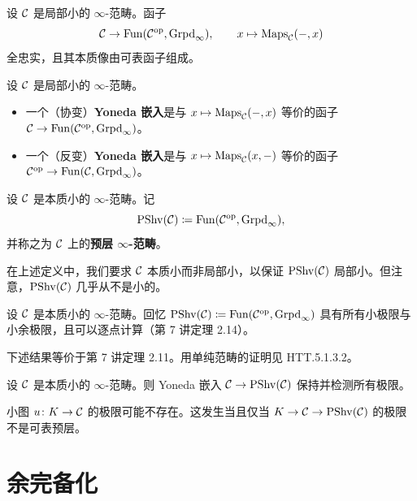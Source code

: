 \begin{corollary}\label{L11-4.8}
设 $\mathcal{C}$ 是局部小的 $\infty$-范畴。函子
\[
\mathcal{C}\to\operatorname{Fun}(\mathcal{C}^{\mathrm{op}},\operatorname{Grpd}_\infty),\qquad x\mapsto\mathrm{Maps}_{\mathcal{C}}(-,x)
\]
全忠实，且其本质像由可表函子组成。
\end{corollary}

\begin{definition}\label{L11-4.9}
设 $\mathcal{C}$ 是局部小的 $\infty$-范畴。
\begin{itemize}[leftmargin=2.2em,itemsep=0.1em]
\item 一个（协变）\textbf{Yoneda 嵌入}是与 $x\mapsto\mathrm{Maps}_{\mathcal{C}}(-,x)$ 等价的函子 $\mathcal{C}\to\operatorname{Fun}(\mathcal{C}^{\mathrm{op}},\operatorname{Grpd}_\infty)$。
\item 一个（反变）\textbf{Yoneda 嵌入}是与 $x\mapsto\mathrm{Maps}_{\mathcal{C}}(x,-)$ 等价的函子 $\mathcal{C}^{\mathrm{op}}\to\operatorname{Fun}(\mathcal{C},\operatorname{Grpd}_\infty)$。
\end{itemize}
\end{definition}

\begin{definition}\label{L11-4.10}
设 $\mathcal{C}$ 是本质小的 $\infty$-范畴。记
\[
\mathrm{PShv}(\mathcal{C})\coloneqq\operatorname{Fun}(\mathcal{C}^{\mathrm{op}},\operatorname{Grpd}_\infty),
\]
并称之为 $\mathcal{C}$ 上的\textbf{预层 $\infty$-范畴}。
\end{definition}

\begin{remark}\label{L11-4.11}
在上述定义中，我们要求 $\mathcal{C}$ 本质小而非局部小，以保证 $\mathrm{PShv}(\mathcal{C})$ 局部小。但注意，$\mathrm{PShv}(\mathcal{C})$ 几乎从不是小的。
\end{remark}

\nitem\label{L11-4.12} 设 $\mathcal{C}$ 是本质小的 $\infty$-范畴。回忆 $\mathrm{PShv}(\mathcal{C})\coloneqq\operatorname{Fun}(\mathcal{C}^{\mathrm{op}},\operatorname{Grpd}_\infty)$ 具有所有小极限与小余极限，且可以逐点计算（第 7 讲定理 2.14）。

下述结果等价于第 7 讲定理 2.11。用单纯范畴的证明见 HTT.5.1.3.2。

\begin{theorem}\label{L11-4.13}
设 $\mathcal{C}$ 是本质小的 $\infty$-范畴。则 Yoneda 嵌入 $\mathcal{C}\to\mathrm{PShv}(\mathcal{C})$ 保持并检测所有极限。
\end{theorem}

\begin{warning}\label{L11-4.14}
小图 $u\colon K\to\mathcal{C}$ 的极限可能不存在。这发生当且仅当 $K\to\mathcal{C}\to\mathrm{PShv}(\mathcal{C})$ 的极限不是可表预层。
\end{warning}

\section{余完备化}

